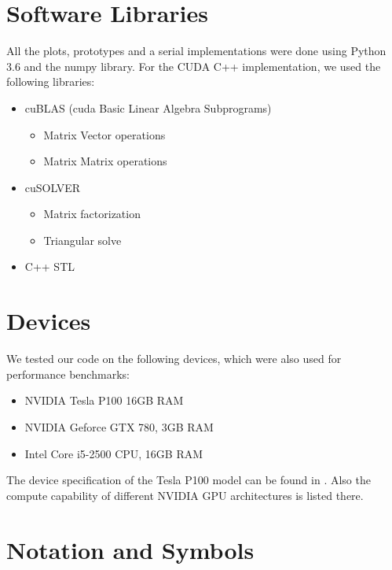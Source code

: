 \section{Software Libraries} \label{sec_libraries}
All the plots, prototypes and a serial implementations were done using Python 3.6 and the numpy library. For the CUDA C++ implementation, we used the following libraries:
\begin{itemize}
	\item cuBLAS (cuda Basic Linear Algebra Subprograms)
	\begin{itemize}
		\item Matrix Vector operations
		\item Matrix Matrix operations
	\end{itemize}
	\item cuSOLVER
	\begin{itemize}
		\item Matrix factorization
		\item Triangular solve
	\end{itemize}
	\item C++ STL
\end{itemize}

\section{Devices} \label{sec_devides}
We tested our code on the following devices, which were also used for performance benchmarks:
\begin{itemize}
	\item NVIDIA Tesla P100 16GB RAM
	\item NVIDIA Geforce GTX 780, 3GB RAM
	\item Intel Core i5-2500 CPU, 16GB RAM
\end{itemize}
The device specification of the Tesla P100 model can be found in \cite{tesla_p100_whitepaper}. Also the compute capability of different NVIDIA GPU architectures is listed there.

\section{Notation and Symbols} \label{sec_notation}
